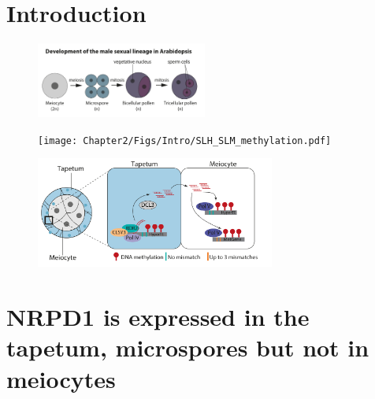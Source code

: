 
\section{Introduction}

\begin{figure}[htbp!] 
\centering    
    \includegraphics[width=0.5\textwidth]{Chapter2/Figs/Intro/male_sex_dev.pdf}
\caption{}
\label{fig:male_sex_deb}
\captionsetup{font=small}
    \caption*{}
\end{figure}

\begin{figure}[htbp!] 
\centering    
        \texttt{[image: Chapter2/Figs/Intro/SLH\_SLM\_methylation.pdf]}
\caption{}
\label{fig:SLH_SLM}
\captionsetup{font=small}
    \caption*{}
\end{figure}

\begin{figure}[htbp!] 
\centering    
        \includegraphics[width=0.7\textwidth]{Chapter2/Figs/Intro/Jincheng_paper_abstract.pdf}
\caption{}
\label{fig:Jincheng_abstract}
\captionsetup{font=small}
    \caption*{}
\end{figure}
\clearpage



\section{NRPD1 is expressed in the tapetum, microspores but not in meiocytes}

